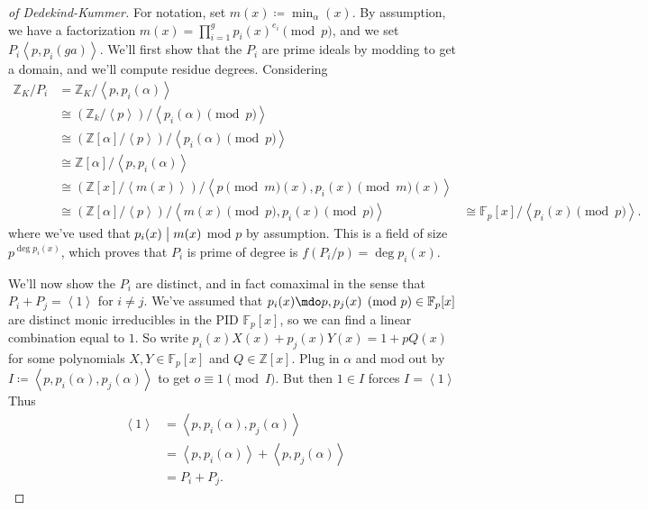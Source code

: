 \begin{proof}[of Dedekind-Kummer]

For notation, set \(m(x) \coloneqq\min_ \alpha(x)\). By assumption, we
have a factorization \(m(x) = \prod_{i=1}^g p_i(x)^{e_i} \pmod p\), and
we set \(P_i \left\langle{ p, p_i( g a) }\right\rangle\). We'll first
show that the \(P_i\) are prime ideals by modding to get a domain, and
we'll compute residue degrees. Considering
\begin{align*}
{\mathbb{Z}}_K/ P_i 
&= {\mathbb{Z}}_K / \left\langle{ p, p_i( \alpha) }\right\rangle \\
&\cong ({\mathbb{Z}}_k / \left\langle{ p }\right\rangle )/ \left\langle{ p_i( \alpha) \pmod p }\right\rangle\\
&\cong ({\mathbb{Z}}[ \alpha] / \left\langle{ p }\right\rangle )/ \left\langle{ p_i( \alpha) \pmod p }\right\rangle\\
&\cong {\mathbb{Z}}[ \alpha] / \left\langle{ p, p_i( \alpha) }\right\rangle \\
&\cong ( {\mathbb{Z}}[x] / \left\langle{ m(x) }\right\rangle ) / \left\langle{ p \pmod m(x), p_i(x) \pmod m(x) }\right\rangle \\
&\cong ( {\mathbb{Z}}[ \alpha] / \left\langle{ p }\right\rangle ) / \left\langle{ m(x) \pmod p, p_i(x) \pmod p }\right\rangle 
&\cong {\mathbb{F}}_p[x] / \left\langle{ p_i(x) \pmod p }\right\rangle 
.\end{align*}
where we've used that \(p_i(x) \bigm|m(x)\) mod \(p\) by assumption.
This is a field of size \(p^{\deg p_i(x)}\), which proves that \(P_i\)
is prime of degree is \(f(P_i / p) = \deg p_i(x)\).

We'll now show the \(P_i\) are distinct, and in fact comaximal in the
sense that \(P_i + P_j = \left\langle{ 1 }\right\rangle\) for
\(i\neq j\). We've assumed that
\(p_i(x) \mdo p, p_j(x) \pmod p \in {\mathbb{F}}_p[x]\) are distinct
monic irreducibles in the PID \({\mathbb{F}}_p[x]\), so we can find a
linear combination equal to \(1\). So write
\(p_i(x) X(x) + p_j(x) Y(x) = 1 + pQ(x)\) for some polynomials
\(X,Y\in {\mathbb{F}}_p[x]\) and \(Q\in {\mathbb{Z}}[ x]\). Plug in
\(\alpha\) and mod out by
\(I \coloneqq\left\langle{ p, p_i( \alpha), p_j( \alpha) }\right\rangle\)
to get \(o \equiv 1 \pmod I\). But then \(1\in I\) forces
\(I = \left\langle{ 1 }\right\rangle\) Thus
\begin{align*}
\left\langle{ 1 }\right\rangle 
&= \left\langle{ p, p_i( \alpha), p_j( \alpha) }\right\rangle \\
&= \left\langle{ p, p_i ( \alpha) }\right\rangle+ \left\langle{ p, p_j( \alpha) }\right\rangle \\
&= P_i + P_j
.\end{align*}


\end{proof}
